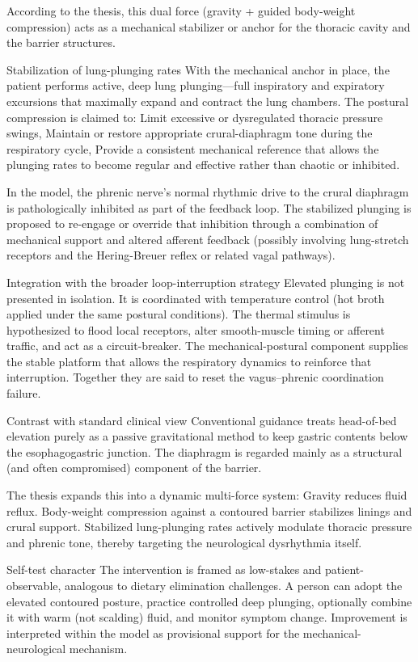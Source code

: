    According to the thesis, this dual force (gravity + guided body-weight compression) acts as a mechanical stabilizer or anchor for the thoracic cavity and the barrier structures.

Stabilization of lung-plunging rates  
   With the mechanical anchor in place, the patient performs active, deep lung plunging—full inspiratory and expiratory excursions that maximally expand and contract the lung chambers. The postural compression is claimed to:
   Limit excessive or dysregulated thoracic pressure swings,
   Maintain or restore appropriate crural-diaphragm tone during the respiratory cycle,
   Provide a consistent mechanical reference that allows the plunging rates to become regular and effective rather than chaotic or inhibited.

   In the model, the phrenic nerve’s normal rhythmic drive to the crural diaphragm is pathologically inhibited as part of the feedback loop. The stabilized plunging is proposed to re-engage or override that inhibition through a combination of mechanical support and altered afferent feedback (possibly involving lung-stretch receptors and the Hering-Breuer reflex or related vagal pathways).

Integration with the broader loop-interruption strategy  
   Elevated plunging is not presented in isolation. It is coordinated with temperature control (hot broth applied under the same postural conditions). The thermal stimulus is hypothesized to flood local receptors, alter smooth-muscle timing or afferent traffic, and act as a circuit-breaker. The mechanical-postural component supplies the stable platform that allows the respiratory dynamics to reinforce that interruption. Together they are said to reset the vagus–phrenic coordination failure.

Contrast with standard clinical view  
   Conventional guidance treats head-of-bed elevation purely as a passive gravitational method to keep gastric contents below the esophagogastric junction. The diaphragm is regarded mainly as a structural (and often compromised) component of the barrier.  

   The thesis expands this into a dynamic multi-force system:  
   Gravity reduces fluid reflux.  
   Body-weight compression against a contoured barrier stabilizes linings and crural support.  
   Stabilized lung-plunging rates actively modulate thoracic pressure and phrenic tone, thereby targeting the neurological dysrhythmia itself.

Self-test character  
   The intervention is framed as low-stakes and patient-observable, analogous to dietary elimination challenges. A person can adopt the elevated contoured posture, practice controlled deep plunging, optionally combine it with warm (not scalding) fluid, and monitor symptom change. Improvement is interpreted within the model as provisional support for the mechanical-neurological mechanism.

